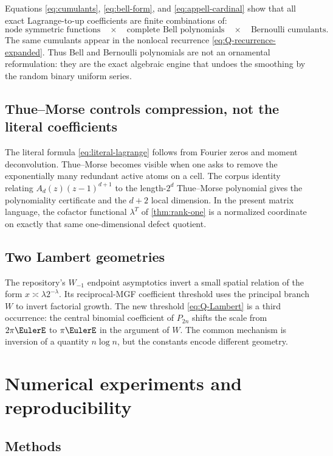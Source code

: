 \documentclass[11pt]{article}
\theoremstyle{definition}
\theoremstyle{remark}
\begin{document}
Equations \eqref{eq:cumulants}, \eqref{eq:bell-form}, and
\eqref{eq:appell-cardinal} show that all exact Lagrange-to-up coefficients are
finite combinations of:
\[
 \text{node symmetric functions}
 \quad\times\quad
 \text{complete Bell polynomials}
 \quad\times\quad
 \text{Bernoulli cumulants}.
\]
The same cumulants appear in the nonlocal recurrence
\eqref{eq:Q-recurrence-expanded}.  Thus Bell and Bernoulli polynomials are not
an ornamental reformulation: they are the exact algebraic engine that undoes
the smoothing by the random binary uniform series.

\subsection{Thue--Morse controls compression, not the literal coefficients}

The literal formula \eqref{eq:literal-lagrange} follows from Fourier zeros and
moment deconvolution.  Thue--Morse becomes visible when one asks to remove the
exponentially many redundant active atoms on a cell.  The corpus identity
relating $A_d(z)(z-1)^{d+1}$ to the length-$2^d$ Thue--Morse polynomial gives
the polynomiality certificate and the $d+2$ local dimension.  In the present
matrix language, the cofactor functional $\lambda^T$ of
\cref{thm:rank-one} is a normalized coordinate on exactly that same
one-dimensional defect quotient.

\subsection{Two Lambert geometries}

The repository's $W_{-1}$ endpoint asymptotics invert a small spatial relation
of the form $x\asymp\lambda2^{-\lambda}$.  Its reciprocal-MGF coefficient
threshold uses the principal branch $W$ to invert factorial growth.  The new
threshold \eqref{eq:Q-Lambert} is a third occurrence: the central binomial
coefficient of $P_{2n}$ shifts the scale from $2\pi\EulerE$ to $\pi\EulerE$ in the
argument of $W$.  The common mechanism is inversion of a quantity
$n\log n$, but the constants encode different geometry.

\section{Numerical experiments and reproducibility}
\label{sec:numerics}

\subsection{Methods}
\end{document}
